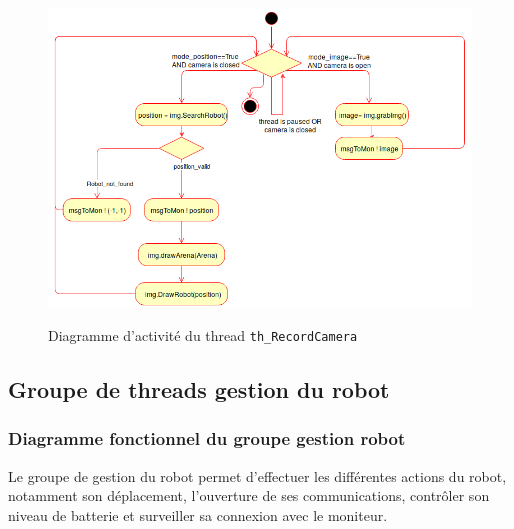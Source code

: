 \documentclass[11pt, a4paper]{paper}
\begin{document}
\begin{figure}[htbp]
\label{fig:act_envoyer}
\begin{center}
{\includegraphics[scale=.3]{./dossier_conception/th_RecordCamera}}
{\caption{Diagramme d'activité du thread {\tt th\_RecordCamera}}}
\end{center}
\end{figure}
\FloatBarrier


\subsection{Groupe de threads gestion du robot}

\subsubsection{Diagramme fonctionnel du groupe gestion robot}
{Le groupe de gestion du robot permet d'effectuer les différentes actions du robot, notamment son déplacement, l'ouverture de ses communications, contrôler son niveau de batterie et surveiller sa connexion avec le moniteur.}
\end{document}
